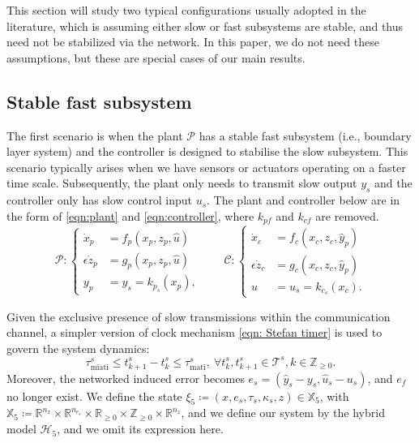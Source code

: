 
This section will study two typical configurations usually adopted in the literature, which is assuming either slow or fast subsystems are stable, and thus need not be stabilized via the network. In this paper, we do not need these assumptions, but these are special cases of our main results.


\subsection{Stable fast subsystem}
The first scenario is when the plant $\mathcal{P}$ has a stable fast subsystem (i.e., boundary layer system) and the controller is designed to stabilise the slow subsystem. This scenario typically arises when we have sensors or actuators operating on a faster time scale.
%
Subsequently, the plant only needs to transmit slow output $y_s$ and the controller only has slow control input $u_s$. The plant and controller below are in the form of \eqref{eqn:plant} and \eqref{eqn:controller}, where $k_{pf}$ and $k_{cf}$ are removed.
\begin{equation*}
    \mathcal{P}\!:\!
    \begin{cases}
    \dot x_p \!\!\!\!\!\!&= f_p(x_p, z_p,\hat u)\\
    \epsilon \dot z_p\!\!\!\!\!\! &= g_p(x_p, z_p, \hat u) \\
    y_p \!\!\!\!\!\!&= y_s = k_{p_s}(x_p)  , 
    \end{cases} \qquad
    \mathcal{C}\!:\!
    \begin{cases}
    \dot x_c \!\!\!\!\!\!&= f_c(x_c, z_c, \hat{y}_p)\\
    \epsilon \dot z_c \!\!\!\!\!\!&= g_c(x_c, z_c, \hat y_p) \\
    u \!\!\!\!\!\!&= u_s = k_{c_s}(x_c).
    \end{cases}
\end{equation*}

Given the exclusive presence of slow transmissions within the communication channel, a simpler version of clock mechanism \eqref{eqn: Stefan timer} is used to govern the system dynamics:
\begin{equation*}
    \tau_{\text{miati}}^s \leq t_{k+1}^s - t_k^s \leq \tau_{\text{mati}}^s, \ \forall t_k^s, t_{k+1}^s\in \mathcal{T}^s, k \in \mathbb{Z}_{\geq 0}.
\end{equation*}
Moreover, the networked induced error becomes $e_s =  (\hat{y}_s - y_s, \hat{u}_s - u_s)$, and $e_f$ no longer exist. We define the state $\xi_5 \coloneqq (x,e_s, \tau_s, \kappa_s, z)\in \mathbb{X}_5$, with $\mathbb{X}_5\coloneqq \mathbb{R}^{n_x}\times \mathbb{R}^{n_{e_s}}\times  \mathbb{R}_{\geq 0} \times \mathbb{Z}_{\geq 0} \times \mathbb{R}^{n_z}$, and we define our system by the hybrid model $\mathcal{H}_5$, and we omit its expression here.

